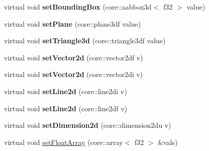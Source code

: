 \begin{DoxyCompactItemize}
\item 
\hypertarget{classirr_1_1io_1_1_c_numbers_attribute_a56749f6240ef140079e60fd916380ba1}{virtual void {\bfseries set\-Bounding\-Box} (core\-::aabbox3d$<$ f32 $>$ value)}\label{classirr_1_1io_1_1_c_numbers_attribute_a56749f6240ef140079e60fd916380ba1}

\item 
\hypertarget{classirr_1_1io_1_1_c_numbers_attribute_ae656ab933f8ca3b69835594988cd367e}{virtual void {\bfseries set\-Plane} (core\-::plane3df value)}\label{classirr_1_1io_1_1_c_numbers_attribute_ae656ab933f8ca3b69835594988cd367e}

\item 
\hypertarget{classirr_1_1io_1_1_c_numbers_attribute_a993d8a4e334167b17cf4acd27af86320}{virtual void {\bfseries set\-Triangle3d} (core\-::triangle3df value)}\label{classirr_1_1io_1_1_c_numbers_attribute_a993d8a4e334167b17cf4acd27af86320}

\item 
\hypertarget{classirr_1_1io_1_1_c_numbers_attribute_a67076bb81b2d9dbfc0dd981854b74af6}{virtual void {\bfseries set\-Vector2d} (core\-::vector2df v)}\label{classirr_1_1io_1_1_c_numbers_attribute_a67076bb81b2d9dbfc0dd981854b74af6}

\item 
\hypertarget{classirr_1_1io_1_1_c_numbers_attribute_a957222038d34f783371fd215b4100dba}{virtual void {\bfseries set\-Vector2d} (core\-::vector2di v)}\label{classirr_1_1io_1_1_c_numbers_attribute_a957222038d34f783371fd215b4100dba}

\item 
\hypertarget{classirr_1_1io_1_1_c_numbers_attribute_a7c6af75526dc22f517913bf3e47433e4}{virtual void {\bfseries set\-Line2d} (core\-::line2di v)}\label{classirr_1_1io_1_1_c_numbers_attribute_a7c6af75526dc22f517913bf3e47433e4}

\item 
\hypertarget{classirr_1_1io_1_1_c_numbers_attribute_a55e59ca6ed0289833e23df9688ca0f24}{virtual void {\bfseries set\-Line2d} (core\-::line2df v)}\label{classirr_1_1io_1_1_c_numbers_attribute_a55e59ca6ed0289833e23df9688ca0f24}

\item 
\hypertarget{classirr_1_1io_1_1_c_numbers_attribute_abbd06c5784f3cc9f2df34bf9e08fb11f}{virtual void {\bfseries set\-Dimension2d} (core\-::dimension2du v)}\label{classirr_1_1io_1_1_c_numbers_attribute_abbd06c5784f3cc9f2df34bf9e08fb11f}

\item 
\hypertarget{classirr_1_1io_1_1_c_numbers_attribute_a0c0bfb499bf08673f3318eeb772a6ce1}{virtual void \hyperlink{classirr_1_1io_1_1_c_numbers_attribute_a0c0bfb499bf08673f3318eeb772a6ce1}{set\-Float\-Array} (core\-::array$<$ f32 $>$ \&vals)}\label{classirr_1_1io_1_1_c_numbers_attribute_a0c0bfb499bf08673f3318eeb772a6ce1}


\end{DoxyCompactItemize}
